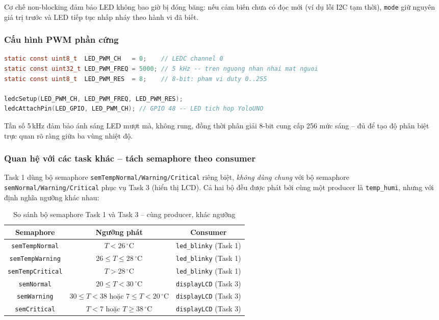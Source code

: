 Cơ chế non-blocking đảm bảo LED không bao giờ bị đóng băng: nếu cảm biến chưa có đọc mới (ví dụ lỗi I2C tạm thời), \texttt{mode} giữ nguyên giá trị trước và LED tiếp tục nhấp nháy theo hành vi đã biết.

\subsubsection*{Cấu hình PWM phần cứng}

\begin{lstlisting}[language=c, caption=Khởi tạo LEDC PWM cho LED đơn (trích led\_blinky.cpp)]
static const uint8_t  LED_PWM_CH   = 0;    // LEDC channel 0
static const uint32_t LED_PWM_FREQ = 5000; // 5 kHz -- tren nguong nhan nhai mat nguoi
static const uint8_t  LED_PWM_RES  = 8;    // 8-bit: pham vi duty 0..255

ledcSetup(LED_PWM_CH, LED_PWM_FREQ, LED_PWM_RES);
ledcAttachPin(LED_GPIO, LED_PWM_CH); // GPIO 48 -- LED tich hop YoloUNO
\end{lstlisting}

Tần số 5\,kHz đảm bảo ánh sáng LED mượt mà, không rung, đồng thời phân giải 8-bit cung cấp 256 mức sáng -- đủ để tạo độ phân biệt trực quan rõ ràng giữa ba vùng nhiệt độ.

\subsubsection*{Quan hệ với các task khác -- tách semaphore theo consumer}

Task 1 dùng bộ semaphore \texttt{semTempNormal/Warning/Critical} riêng biệt, \textit{không dùng chung} với bộ semaphore \texttt{semNormal/Warning/Critical} phục vụ Task 3 (hiển thị LCD). Cả hai bộ đều được phát bởi cùng một producer là \texttt{temp\_humi}, nhưng với định nghĩa ngưỡng khác nhau:

\begin{table}[h!]
\centering
\caption{So sánh bộ semaphore Task 1 và Task 3 -- cùng producer, khác ngưỡng}
\label{tab:task1-vs-task3-sem}
\begin{tabular}{|c|c|c|}
\hline
\textbf{Semaphore} & \textbf{Ngưỡng phát} & \textbf{Consumer} \\
\hline
\texttt{semTempNormal}   & $T < 26\,^\circ\mathrm{C}$               & \texttt{led\_blinky} (Task 1) \\
\texttt{semTempWarning}  & $26 \leq T \leq 28\,^\circ\mathrm{C}$   & \texttt{led\_blinky} (Task 1) \\
\texttt{semTempCritical} & $T > 28\,^\circ\mathrm{C}$               & \texttt{led\_blinky} (Task 1) \\
\hline
\texttt{semNormal}   & $20 \leq T < 30\,^\circ\mathrm{C}$           & \texttt{displayLCD} (Task 3) \\
\texttt{semWarning}  & $30 \leq T < 38$ hoặc $7 \leq T < 20\,^\circ\mathrm{C}$ & \texttt{displayLCD} (Task 3) \\
\texttt{semCritical} & $T < 7$ hoặc $T \geq 38\,^\circ\mathrm{C}$  & \texttt{displayLCD} (Task 3) \\
\hline
\end{tabular}
\end{table}

